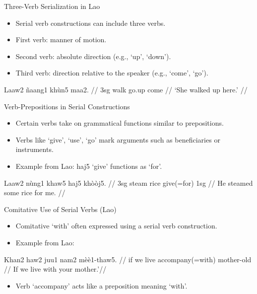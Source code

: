\documentclass{beamer}
\begin{document}
\begin{frame}{Three-Verb Serialization in Lao}
\begin{itemize}
    \item Serial verb constructions can include three verbs.
    \item First verb: manner of motion.
    \item Second verb: absolute direction (e.g., ‘up’, ‘down’).
    \item Third verb: direction relative to the speaker (e.g., ‘come’, ‘go’).
\end{itemize}
\ex
\begingl
\gla Laaw2 ñaang1 khùn5 maa2. //
\glb 3sg walk go.up come //
\glft ‘She walked up here.’ //
\endgl
\xe
\end{frame}

\begin{frame}{Verb-Prepositions in Serial Constructions}
\begin{itemize}
    \item Certain verbs take on grammatical functions similar to prepositions.
    \item Verbs like ‘give’, ‘use’, ‘go’ mark arguments such as beneficiaries or instruments.
    \item Example from Lao: haj5 ‘give’ functions as ‘for’.
\end{itemize}
\ex
\begingl
\gla Laaw2 nùng1 khaw5 haj5 khòòj5. //
\glb 3sg steam rice give(=for) 1sg //
\glft He steamed some rice for me. //
\endgl
\xe
\end{frame}

\begin{frame}{Comitative Use of Serial Verbs (Lao)}
\begin{itemize}
    \item Comitative ‘with’ often expressed using a serial verb construction.
    \item Example from Lao:
\end{itemize}
\ex
\begingl
\gla Khan2 haw2 juu1 nam2 mèè1-thaw5. //
\glb if we live accompany(=with) mother-old //
\glft If we live with your mother.’//
\endgl
\xe
\begin{itemize}
    \item Verb ‘accompany’ acts like a preposition meaning ‘with’.
\end{itemize}
\end{frame}
\end{document}
